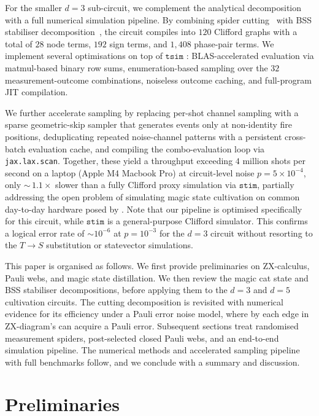 \documentclass[a4paper,onecolumn,11pt,accepted=2026-06-10]{quantumarticle}
\begin{document}
For the smaller $d=3$ sub-circuit, we complement the analytical decomposition with a full numerical simulation pipeline. By combining spider cutting~\cite{Sutcliffe2025thesis} with BSS stabiliser decomposition~\cite{BSS2016}, the circuit compiles into $120$ Clifford graphs with a total of $28$ node terms, $192$ sign terms, and $1{,}408$ phase-pair terms. We implement several optimisations on top of $\mathtt{tsim}$ \cite{QuEraComputing_tsim_2026}: BLAS-accelerated evaluation via matmul-based binary row sums, enumeration-based sampling over the $32$ measurement-outcome combinations, noiseless outcome caching, and full-program JIT compilation. 

We further accelerate sampling by replacing per-shot channel sampling with a sparse geometric-skip sampler that generates events only at non-identity fire positions, deduplicating repeated noise-channel patterns with a persistent cross-batch evaluation cache, and compiling the combo-evaluation loop via \texttt{jax.lax.scan}. Together, these yield a throughput exceeding $4$ million shots per second on a laptop (Apple M4 Macbook Pro) at circuit-level noise $p = 5\times10^{-4}$, only ${\sim}\,1.1\times$ slower than a fully Clifford proxy simulation via $\mathtt{stim}$, partially addressing the open problem of simulating magic state cultivation on common day-to-day hardware posed by \cite{gidney2024magicstatecultivationgrowing}. Note that our pipeline is optimised specifically for this circuit, while $\mathtt{stim}$ is a general-purpose Clifford simulator. This confirms a logical error rate of $\sim\!10^{-6}$ at $p = 10^{-3}$ for the $d=3$ circuit without resorting to the $T \to S$ substitution or statevector simulations.

This paper is organised as follows. We first provide preliminaries on ZX-calculus, Pauli webs, and magic state distillation. We then review the magic cat state and BSS stabiliser decompositions, before applying them to the $d=3$ and $d=5$ cultivation circuits. The cutting decomposition is revisited with numerical evidence for its efficiency under a Pauli error noise model, where by each edge in ZX-diagram's can acquire a Pauli error. Subsequent sections treat randomised measurement spiders, post-selected closed Pauli webs, and an end-to-end simulation pipeline. The numerical methods and accelerated sampling pipeline with full benchmarks follow, and we conclude with a summary and discussion.

\section{Preliminaries}
\label{sec:zx-notation}
\end{document}
